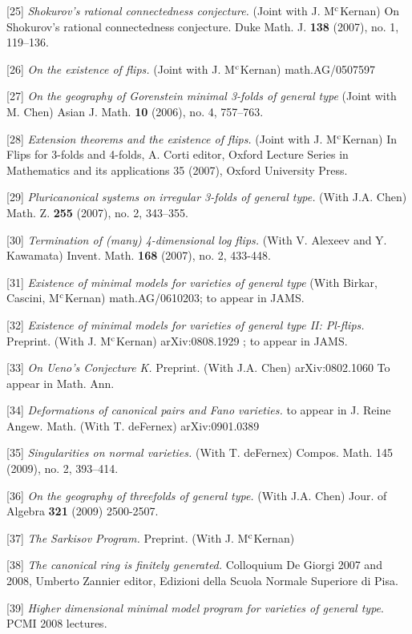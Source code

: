 \documentclass[12pt] {amsart}
\begin{document}
[25] {\it Shokurov's rational connectedness conjecture.}
(Joint with J. M$^{\rm{c}}$Kernan) On Shokurov's rational connectedness conjecture.  Duke Math. J. {\bf  138}  (2007),  no. 1, 119--136.

[26] {\it On the existence of flips.}
(Joint with J. M$^{\rm{c}}$Kernan) math.AG/0507597

[27] {\it On the geography of Gorenstein minimal 3-folds of general type}
(Joint with M. Chen)  Asian J. Math. {\bf  10}  (2006),  no. 4, 757--763.

[28] {\it Extension theorems and the existence of flips.}
(Joint with J. M$^{\rm{c}}$Kernan) In Flips for 3-folds and 4-folds, A. Corti editor, Oxford Lecture Series in Mathematics and its applications 35 (2007), Oxford University Press.

[29] {\it Pluricanonical systems on irregular 3-folds of general type.} (With J.A. Chen)  Math. Z. {\bf 255}  (2007),  no. 2, 343--355.

[30] {\it Termination of (many) 4-dimensional log flips.} (With V. Alexeev and Y. Kawamata) Invent. Math. {\bf  168}  (2007),  no. 2, 433-448.

[31] {\it Existence of minimal models for varieties of general type}
(With Birkar, Cascini, M$^{\rm c}$Kernan) math.AG/0610203; to appear in JAMS. 

[32] {\it Existence of minimal models for varieties of general type II: Pl-flips.} Preprint. (With J. M$^{\rm c}$Kernan) arXiv:0808.1929 ; to appear in JAMS.

[33] {\it On Ueno's Conjecture K.} Preprint. (With J.A. Chen) arXiv:0802.1060  To appear in Math. Ann.

[34] {\it Deformations of canonical pairs and Fano varieties.} to appear in J. Reine Angew. Math. (With T. deFernex) arXiv:0901.0389 

[35] {\it Singularities on normal varieties.} (With T. deFernex) Compos. Math.  145  (2009),  no. 2, 393--414.

[36] {\it On the geography of threefolds of general type.} (With J.A. Chen)
Jour. of Algebra {\bf 321} (2009) 2500-2507. 

[37] {\it The Sarkisov Program.} Preprint. (With J. M$^{\rm c}$Kernan)

[38] {\it The canonical ring is finitely generated.} Colloquium De Giorgi 2007 and 2008, Umberto Zannier editor, Edizioni della Scuola Normale Superiore di Pisa.

[39] {\it Higher dimensional minimal model program for varieties of general type}. PCMI 2008 lectures.
\end{document}
